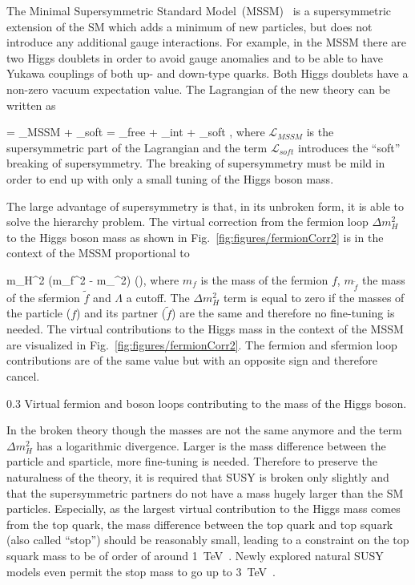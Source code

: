 The Minimal Supersymmetric Standard Model~(MSSM)~\cite{Martin:1997ns} is a supersymmetric extension of the SM which adds a minimum of new particles, but does not introduce any additional gauge interactions. For example, in the MSSM there are two Higgs doublets in order to avoid gauge anomalies and to be able to have Yukawa couplings of both up- and down-type quarks. Both Higgs doublets have a non-zero vacuum expectation value. The Lagrangian of the new theory can be written as

{
     =  _{MSSM} +  _{soft} = _{free} + _{int} + _{soft}    ,
}
where $\mathcal{L}_{MSSM}$ is the supersymmetric part of the Lagrangian and the term $\mathcal{L}_{soft}$ introduces the ``soft'' breaking of supersymmetry. The breaking of supersymmetry must be mild in order to end up with only a small tuning of the Higgs boson mass. 


The large advantage of supersymmetry is that, in its unbroken form, it is able to solve the hierarchy problem. The virtual correction from the fermion loop $\Delta m_{H}^{2}$ to the Higgs boson mass as shown in Fig.~\ref{fig:figures/fermionCorr2} is in the context of the MSSM proportional to

{
\Delta m_{H}^{2} \propto (m_{f}^{2} - m_{}^2)  \left(\right),
}
where $m_{f}$ is the mass of the fermion $f$, $m_{\tilde{f}}$ the mass of the sfermion $\tilde{f}$ and $\Lambda$ a cutoff. The $\Delta m_{H}^{2}$ term is equal to zero if the masses of the particle ($f$) and its partner ($\tilde{f}$) are the same and therefore no fine-tuning is needed. The virtual contributions to the Higgs mass in the context of the MSSM are visualized in Fig.~\ref{fig:figures/fermionCorr2}. The fermion and sfermion loop contributions are of the same value but with an opposite sign and therefore cancel. 


                 {0.3}       %
                 { Virtual fermion and boson loops contributing to the mass of the Higgs boson.}

In the broken theory though the masses are not the same anymore and the term $\Delta m_{H}^{2}$ has a logarithmic divergence. Larger is the mass difference between the particle and sparticle, more fine-tuning is needed. Therefore to preserve the naturalness of the theory, it is required that SUSY is broken only slightly and that the supersymmetric partners do not have a mass hugely larger than the SM particles. Especially, as the largest virtual  contribution to the Higgs mass comes from the top quark, the mass difference between the top quark and top squark (also called ``stop'') should be reasonably small, leading to a constraint on the top squark mass to be of order of around 1~TeV~\cite{Martin:1997ns, Barbieri:1987fn, Papucci:2011wy}. Newly explored natural SUSY models even permit the stop mass to go up to 3~TeV~\cite{Baer:2016bwh}.


